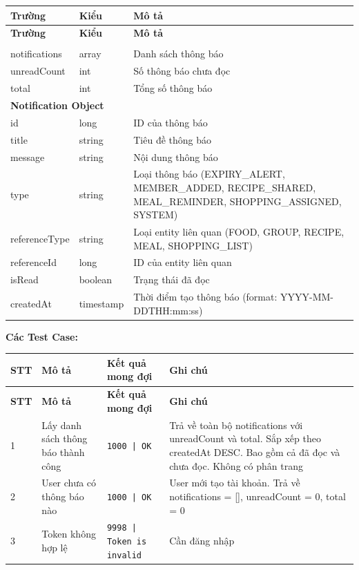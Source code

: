 \begin{longtable}{|p{}|p{}|p{}|}
\hline
\textbf{Trường} & \textbf{Kiểu} & \textbf{Mô tả} \\
\hline
\endfirsthead

\hline
\textbf{Trường} & \textbf{Kiểu} & \textbf{Mô tả} \\
\hline
\endhead

\hline
\endfoot

\multicolumn{3}{|l|}{\textbf{Data Object}} \\
\hline
notifications & array & Danh sách thông báo \\
\hline
unreadCount & int & Số thông báo chưa đọc \\
\hline
total & int & Tổng số thông báo \\
\hline
\multicolumn{3}{|l|}{\textbf{Notification Object}} \\
\hline
id & long & ID của thông báo \\
\hline
title & string & Tiêu đề thông báo \\
\hline
message & string & Nội dung thông báo \\
\hline
type & string & Loại thông báo (EXPIRY\_ALERT, MEMBER\_ADDED, RECIPE\_SHARED, MEAL\_REMINDER, SHOPPING\_ASSIGNED, SYSTEM) \\
\hline
referenceType & string & Loại entity liên quan (FOOD, GROUP, RECIPE, MEAL, SHOPPING\_LIST) \\
\hline
referenceId & long & ID của entity liên quan \\
\hline
isRead & boolean & Trạng thái đã đọc \\
\hline
createdAt & timestamp & Thời điểm tạo thông báo (format: YYYY-MM-DDTHH:mm:ss) \\
\hline
\end{longtable}

\textbf{Các Test Case:}

\begin{longtable}{|p{}|p{}|p{}|p{}|}
\hline
\textbf{STT} & \textbf{Mô tả} & \textbf{Kết quả mong đợi} & \textbf{Ghi chú} \\
\hline
\endfirsthead

\hline
\textbf{STT} & \textbf{Mô tả} & \textbf{Kết quả mong đợi} & \textbf{Ghi chú} \\
\hline
\endhead

\hline
\endfoot

1 & Lấy danh sách thông báo thành công & \texttt{1000 | OK} & Trả về toàn bộ notifications với unreadCount và total. Sắp xếp theo createdAt DESC. Bao gồm cả đã đọc và chưa đọc. Không có phân trang \\
\hline
2 & User chưa có thông báo nào & \texttt{1000 | OK} & User mới tạo tài khoản. Trả về notifications = [], unreadCount = 0, total = 0 \\
\hline
3 & Token không hợp lệ & \texttt{9998 | Token is invalid} & Cần đăng nhập \\
\hline
\end{longtable}

